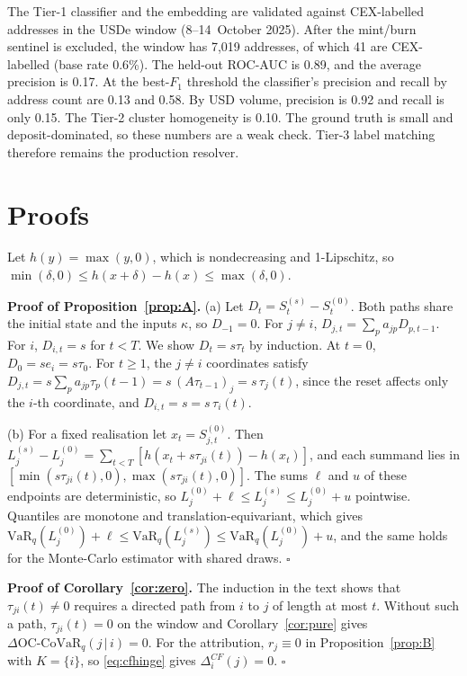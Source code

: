 \documentclass[referee,pdflatex,sn-mathphys-ay]{sn-jnl}
\theoremstyle{thmstyleone}%
\theoremstyle{thmstyletwo}%
\theoremstyle{thmstylethree}%
\newcommand{\VaR}{\mathrm{VaR}}
\newcommand{\OCCoVaR}{\text{OC-CoVaR}}
\begin{document}
\begin{appendices}
The Tier-1 classifier and the embedding are validated against CEX-labelled addresses in the USDe window
(8--14~October 2025). After the mint/burn sentinel is excluded, the window has 7{,}019 addresses, of which 41 are CEX-labelled
(base rate 0.6\%). The held-out ROC-AUC is 0.89, and the average precision is 0.17. At the best-$F_1$
threshold the classifier's precision and recall by address count are 0.13 and 0.58. By USD volume, precision is
0.92 and recall is only 0.15. The Tier-2 cluster homogeneity is 0.10.
The ground truth is small and deposit-dominated, so these numbers are a weak check. Tier-3 label matching therefore remains the
production resolver.

\section{Proofs}\label{app:proofs}

Let $h(y)=\max(y,0)$, which is nondecreasing and 1-Lipschitz, so $\min(\delta,0)\le h(x+\delta)-h(x)\le\max(\delta,0)$.

\noindent\textbf{Proof of Proposition~\ref{prop:A}.} (a) Let $D_t=S^{(s)}_t-S^{(0)}_t$.
Both paths share the initial state and the inputs $\kappa$, so $D_{-1}=0$. For $j\neq i$,
$D_{j,t}=\sum_p a_{jp}D_{p,t-1}$. For $i$, $D_{i,t}=s$ for $t<T$. We show $D_t=s\tau_t$ by
induction. At $t=0$, $D_0=se_i=s\tau_0$. For $t\ge1$, the $j\neq i$ coordinates satisfy
$D_{j,t}=s\sum_pa_{jp}\tau_{p}(t-1)=s\,(A\tau_{t-1})_j=s\,\tau_j(t)$, since the reset
affects only the $i$-th coordinate, and $D_{i,t}=s=s\,\tau_i(t)$.

(b) For a fixed realisation let $x_t=S^{(0)}_{j,t}$. Then $L_j^{(s)}-L_j^{(0)}=\sum_{t<T}[h(x_t+s\tau_{ji}(t))-h(x_t)]$, and each summand lies in $[\min(s\tau_{ji}(t),0),\max(s\tau_{ji}(t),0)]$. The sums $\ell$ and $u$ of these endpoints are deterministic, so $L_j^{(0)}+\ell\le L_j^{(s)}\le L_j^{(0)}+u$ pointwise. Quantiles are monotone and translation-equivariant, which gives $\VaR_q(L^{(0)}_j)+\ell\le\VaR_q(L^{(s)}_j)\le\VaR_q(L^{(0)}_j)+u$, and the same holds for the Monte-Carlo estimator with shared draws. \hfill$\square$

\noindent\textbf{Proof of Corollary~\ref{cor:zero}.} The induction in the text shows that $\tau_{ji}(t)\neq0$ requires a directed path from $i$ to $j$ of length at most $t$. Without such a path, $\tau_{ji}(t)=0$ on the window and Corollary~\ref{cor:pure} gives $\Delta\OCCoVaR_q(j\,|\,i)=0$. For the attribution, $r_j\equiv0$ in Proposition~\ref{prop:B} with $K=\{i\}$, so \eqref{eq:cfhinge} gives $\Delta_i^{CF}(j)=0$. \hfill$\square$


\end{appendices}
\end{document}
